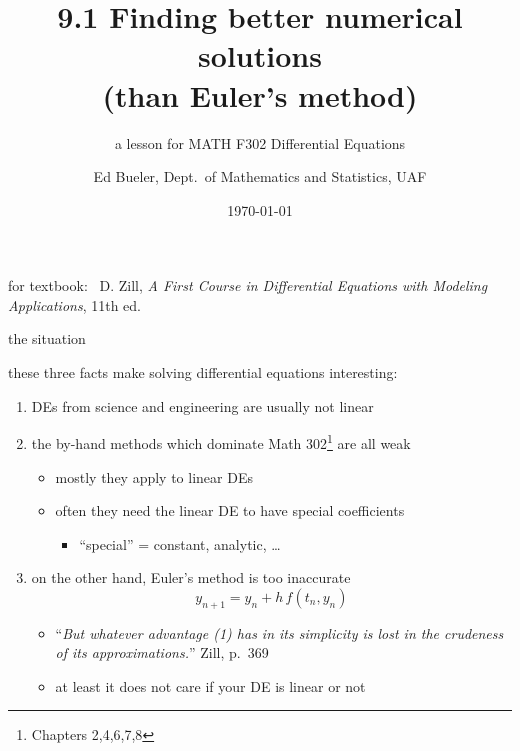 \documentclass[urlcolor=blue,dvipsnames]{beamer}
\title{9.1 Finding better numerical solutions \\ (than Euler's method)}
\subtitle{a lesson for MATH F302 Differential Equations}
\author{Ed Bueler, Dept.~of Mathematics and Statistics, UAF}
\date{\tiny \today}
\begin{document}
\renewcommand{\thefootnote}{{\color{green} \arabic{footnote}}}

\begin{frame}
\titlepage

\centerline{\tiny for textbook: \, D. Zill, \emph{A First Course in Differential Equations with Modeling Applications}, 11th ed.}
\end{frame}


\begin{frame}{the situation}

these three facts make solving differential equations interesting:
\begin{enumerate}
\item DEs from science and engineering are usually \alert{not linear}
\item the by-hand methods which dominate Math 302\footnote{Chapters 2,4,6,7,8} are \alert{all weak}
    \begin{itemize}
    \item mostly they apply to linear DEs
    \item often they need the linear DE to have special coefficients
        \begin{itemize}
        \item ``special'' = constant, analytic, \dots
        \end{itemize}
    \end{itemize}
\item on the other hand, Euler's method is \alert{too inaccurate}
\begin{equation}
    y_{n+1} = y_n + h\, f(t_n,y_n)
\end{equation}

\vspace{-2mm}
    \begin{itemize}
    \item ``\emph{But whatever advantage {\normalfont (1)} has in its simplicity is lost in the crudeness of its approximations.}'' \hfill Zill, p.~369
    \item at least it does not care if your DE is linear or not
    \end{itemize}
\end{enumerate}
\end{frame}
\end{document}
